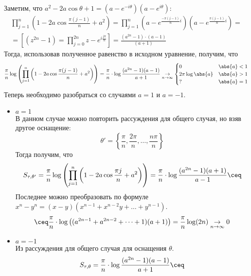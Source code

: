 \begin{example}
\begin{enumerate}
    Заметим, что $a ^ 2 - 2a \cos{\theta} + 1 = (a - e ^ {-i \theta})(a - e ^ {i \theta})$:
    \[
        \begin{gathered}
            \prod_{j = 1}^n \left(1 - 2a \cos{\frac{\pi (j - 1)}{n} + a ^ 2}\right)=
            \prod_{j = 1}^n \left(a - e ^ {\frac{-\pi (j - 1)}{n} i }\right)\left(a - e ^ {\frac{\pi (j - 1)}{n} i }\right)=\\
            =\left[(z^{2n} - 1) = \prod\limits_{j=0}^{2n}{z - e^{i\frac{j \pi}{n}}}\right]=
            \frac{(a ^ {2n} - 1) \cdot (a - 1)}{(a + 1)} 
        \end{gathered}
    \]
    Тогда, использовав полученное равенство в исходном уравнение, получим, что 
    \[
        \frac{\pi}{n} \log\left(\prod_{j = 1}^n \left(1 - 2a \cos{\frac{\pi (j - 1)}{n} + a ^ 2}\right)\right)=
        \frac{\pi}{n} \cdot \log{\frac{(a ^ {2n} - 1)(a - 1)}{a + 1}} \underset{n \to \infty}{\to}
        \begin{cases}
            0 & \abs{a} < 1 \\
            2 \pi \log{\abs{a}} & \abs{a} > 1 \\
            ? & \abs{a} = 1
        \end{cases}
    \]
    Теперь необходимо разобраться со случаями $a = 1$ и $a = -1$.
    \begin{itemize}
        \item $a = 1$\\
            В данном случае можно повторить рассуждения для общего случая, но взяв другое оснащение: 
            \[
                \theta' = \left\{\frac{\pi}{n}, \frac{2\pi}{n}, \dots, \frac{n\pi}{n}\right\}
            \] 
            Тогда получим, что 
            \[
                S_{\tau, \theta'} = \frac{\pi}{n} \log\left(\prod_{j = 1}^n \left(1 - 2a \cos{\frac{\pi j}{n} + a ^ 2}\right)\right)=
                \frac{\pi}{n} \cdot \log{\frac{(a ^ {2n} - 1)(a + 1)}{a - 1}} \ceq\\
            \] 
            Последнее можно преобразовать по формуле $x^n - y^n = (x - y)(x^{n - 1} + x^{n - 2}y + \dots + y^{n - 1})$.
            \[
                \ceq \frac{\pi}{n}\cdot \log\left((a^{2n - 1}+a^{2n - 2} + \dots + 1)(a + 1)\right) = 
                \frac{\pi}{n}\log(2n) \underset{n\to\infty}{\to} 0
            \] 
        \item $a = -1$\\
            Из рассуждения для общего случая для оснащения $\theta$.
            \[
                S_{\tau,\theta} = \frac{\pi}{n} \cdot \log{\frac{(a ^ {2n} - 1)(a - 1)}{a + 1}} \ceq
\]
\end{itemize}
\end{enumerate}
\end{example}
